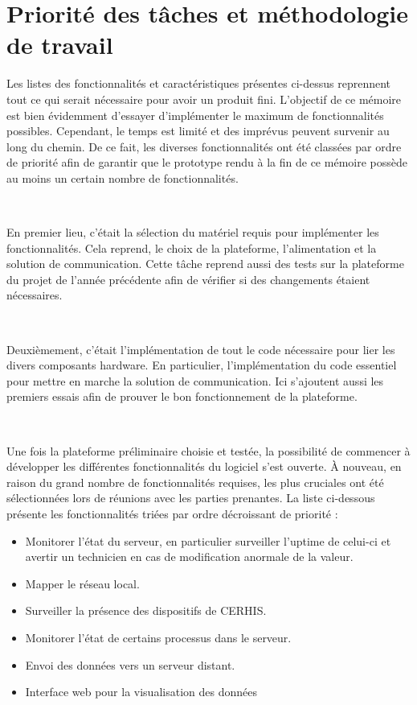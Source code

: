 \section{Priorité des tâches et méthodologie de travail}

Les listes des fonctionnalités et caractéristiques présentes ci-dessus reprennent tout ce qui serait nécessaire pour avoir un produit fini. L’objectif de ce mémoire est bien évidemment d’essayer d’implémenter le maximum de fonctionnalités possibles. Cependant, le temps est limité et des imprévus peuvent survenir au long du chemin. De ce fait, les diverses fonctionnalités ont été classées par ordre de priorité afin de garantir que le prototype rendu à la fin de ce mémoire possède au moins un certain nombre de fonctionnalités.

~

\noindent
En premier lieu, c’était la sélection du matériel requis pour implémenter les fonctionnalités. Cela reprend, le choix de la plateforme, l’alimentation et la solution de communication. Cette tâche reprend aussi des tests sur la plateforme du projet de l’année précédente afin de vérifier si des changements étaient nécessaires.

~

\noindent
Deuxièmement, c’était l’implémentation de tout le code nécessaire pour lier les divers composants hardware. En particulier, l’implémentation du code essentiel pour mettre en marche la solution de communication. Ici s’ajoutent aussi les premiers essais afin de prouver le bon fonctionnement de la plateforme.

~

\noindent
Une fois la plateforme préliminaire choisie et testée, la possibilité de commencer à développer les différentes fonctionnalités du logiciel s’est ouverte. À nouveau, en raison du grand nombre de fonctionnalités requises, les plus cruciales ont été sélectionnées lors de réunions avec les parties prenantes. La liste ci-dessous présente les fonctionnalités triées par ordre décroissant de priorité :
\begin{itemize}
  \item Monitorer l’état du serveur, en particulier surveiller l’uptime de celui-ci et avertir un technicien en cas de modification anormale de la valeur.
  \item Mapper le réseau local.
  \item Surveiller la présence des dispositifs de CERHIS.
  \item Monitorer l’état de certains processus dans le serveur.
  \item Envoi des données vers un serveur distant.
  \item Interface web pour la visualisation des données
\end{itemize}

